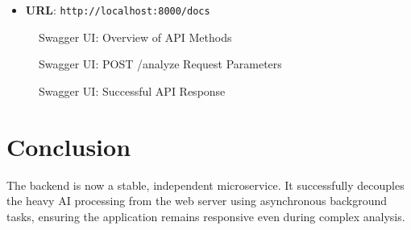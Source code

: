 \documentclass{article}
\begin{document}
\begin{itemize}
    \item \textbf{URL}: \texttt{http://localhost:8000/docs}
\end{itemize}

\begin{figure}[h]
    \centering
    \caption{Swagger UI: Overview of API Methods}
    \label{fig:swagger-methods}
\end{figure}

\begin{figure}[h]
    \centering
    \caption{Swagger UI: POST /analyze Request Parameters}
    \label{fig:swagger-params}
\end{figure}

\begin{figure}[h]
    \centering
    \caption{Swagger UI: Successful API Response}
    \label{fig:swagger-response}
\end{figure}

\section{Conclusion}
The backend is now a stable, independent microservice. It successfully decouples the heavy AI processing from the web server using asynchronous background tasks, ensuring the application remains responsive even during complex analysis.
\end{document}
